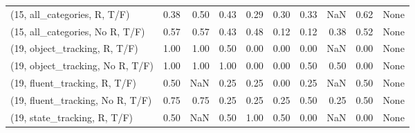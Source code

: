 \begin{table*}[h!]
\begin{adjustbox}{width=2\columnwidth,center}
\begin{tabular}{lrrr|rrr|rrr}
(15, all\_categories, R, T/F)          &                      0.38 &                  0.50 &                      0.43 &                          0.29 &                      0.30 &                          0.33 &                                    NaN &                               0.62 &                                  None \\
(15, all\_categories, No R, T/F)       &                      0.57 &                  0.57 &                      0.43 &                          0.48 &                      0.12 &                          0.12 &                                   0.38 &                               0.52 &                                  None \\



\midrule
(19, object\_tracking, R, T/F)         &                      1.00 &                  1.00 &                      0.50 &                          0.00 &                      0.00 &                          0.00 &                                    NaN &                               0.00 &                                  None \\
(19, object\_tracking, No R, T/F)      &                      1.00 &                  1.00 &                      1.00 &                          0.00 &                      0.00 &                          0.50 &                                   0.50 &                               0.00 &                                  None \\
(19, fluent\_tracking, R, T/F)         &                      0.50 &                   NaN &                      0.25 &                          0.25 &                      0.00 &                          0.25 &                                    NaN &                               0.50 &                                  None \\
(19, fluent\_tracking, No R, T/F)      &                      0.75 &                  0.75 &                      0.25 &                          0.25 &                      0.25 &                          0.50 &                                   0.25 &                               0.50 &                                  None \\
(19, state\_tracking, R, T/F)          &                      0.50 &                   NaN &                      0.50 &                          1.00 &                      0.50 &                          0.00 &                                    NaN &                               0.00 &                                  None \\

\end{tabular}
\end{adjustbox}
\end{table*}
